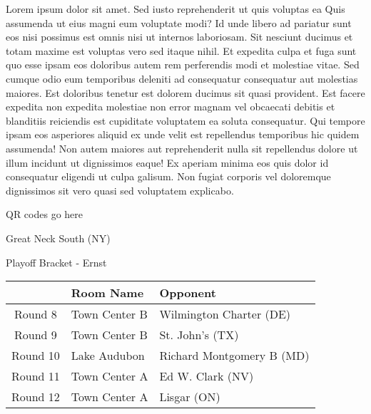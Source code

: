 \documentclass{article}%
\begin{document}
\vspace*{8pt}%
\linebreak%
\newline%
\newline%
Lorem ipsum dolor sit amet. Sed iusto reprehenderit ut quis voluptas ea Quis assumenda ut eius magni eum voluptate modi? Id unde libero ad pariatur sunt eos nisi possimus est omnis nisi ut internos laboriosam. Sit nesciunt ducimus et totam maxime est voluptas vero sed itaque nihil. Et expedita culpa et fuga sunt quo esse ipsam eos doloribus autem rem perferendis modi et molestiae vitae.\newline%
\newline%
Sed cumque odio eum temporibus deleniti ad consequatur consequatur aut molestias maiores. Est doloribus tenetur est dolorem ducimus sit quasi provident. Est facere expedita non expedita molestiae non error magnam vel obcaecati debitis et blanditiis reiciendis est cupiditate voluptatem ea soluta consequatur. Qui tempore ipsam eos asperiores aliquid ex unde velit est repellendus temporibus hic quidem assumenda!\newline%
\newline%
Non autem maiores aut reprehenderit nulla sit repellendus dolore ut illum incidunt ut dignissimos eaque! Ex aperiam minima eos quis dolor id consequatur eligendi ut culpa galisum. Non fugiat corporis vel doloremque dignissimos sit vero quasi sed voluptatem explicabo.\newline%
\newline%
%
\vspace*{30pt}%
\begin{center}%
\begin{Huge}%
QR codes go here%
\end{Huge}%
\end{center}%
\newpage%
\begin{center}%
\begin{Huge}%
Great Neck South (NY)%
\end{Huge}%
\vspace*{8pt}%
\linebreak%
\begin{Large}%
Playoff Bracket {-} Ernst%
\end{Large}%
\end{center}%
%
\begin{tabularx}{\textwidth}{|c|Y|Y|}%
\hline%
&Room Name&Opponent\\%
\hline%
Round 8&Town Center B&Wilmington Charter (DE)\\%
Round 9&Town Center B&St. John's (TX)\\%
Round 10&Lake Audubon&Richard Montgomery B (MD)\\%
Round 11&Town Center A&Ed W. Clark (NV)\\%
Round 12&Town Center A&Lisgar (ON)\\%
\hline%
\end{tabularx}%
\end{document}
